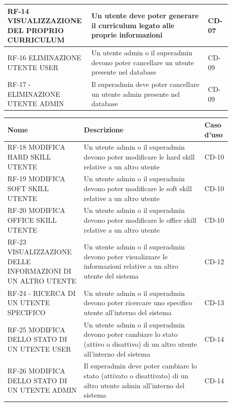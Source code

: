 \begin{center}
\begin{tabular}{|p{0.3\linewidth}|p{0.5\linewidth}|p{0.10\linewidth}|}
    \hline
    \rowcolor{Orange}
    RF-14 VISUALIZZAZIONE DEL PROPRIO CURRICULUM & Un utente deve poter generare il curriculum legato alle proprie informazioni & CD-07 \\
    \hline
    \rowcolor{DarkOrange}
    RF-16 ELIMINAZIONE UTENTE USER & Un utente admin o il superadmin devono poter cancellare un utente presente nel database & CD-09 \\
    \hline
    \rowcolor{LighterOrange}
    RF-17 - ELIMINAZIONE UTENTE ADMIN & Il superadmin deve poter cancellare un utente admin presente nel database & CD-09 \\
    \hline
    \end{tabular}
\end{center}

\begin{center}
    \begin{tabular}{|p{0.3\linewidth}|p{0.5\linewidth}|p{0.10\linewidth}|}
    \hline
        \textbf{Nome} & \textbf{Descrizione} & \textbf{Caso d'uso} \\
    \hline
    \rowcolor{LighterOrange}
    RF-18 MODIFICA HARD SKILL UTENTE & Un utente admin o il superadmin devono poter modificare le hard skill relative a un altro utente & CD-10 \\
    \hline
    \rowcolor{LighterOrange}
    RF-19 MODIFICA SOFT SKILL UTENTE & Un utente admin o il superadmin devono poter modificare le soft skill relative a un altro utente & CD-10 \\
    \hline
    \rowcolor{LighterOrange}
    RF-20 MODIFICA OFFICE SKILL UTENTE & Un utente admin o il superadmin devono poter modificare le office skill relative a un altro utente & CD-10 \\
    \hline
    \rowcolor{Orange}
    RF-23 VISUALIZZAZIONE DELLE INFORMAZIONI DI UN ALTRO UTENTE & Un utente admin o il superadmin devono poter visualizzare le informazioni relative a un altro utente del sistema & CD-12 \\
    \hline
    \rowcolor{DarkOrange}
    RF-24 - RICERCA DI UN UTENTE SPECIFICO & Un utente admin o il superadmin devono poter ricercare uno specifico utente all’interno del sistema & CD-13 \\
    \hline
    \rowcolor{LightOrange}
    RF-25 MODIFICA DELLO STATO DI UN UTENTE USER & Un utente admin o il superadmin devono poter cambiare lo stato (attivo o disattivo) di un altro utente all’interno del sistema & CD-14 \\
    \hline
    \rowcolor{LightOrange}
    RF-26 MODIFICA DELLO STATO DI UN UTENTE ADMIN & Il superadmin deve poter cambiare lo stato (attivato o disattivato) di un altro utente admin all’interno del sistema & CD-14 \\
    \hline
    \end{tabular}
\end{center}

